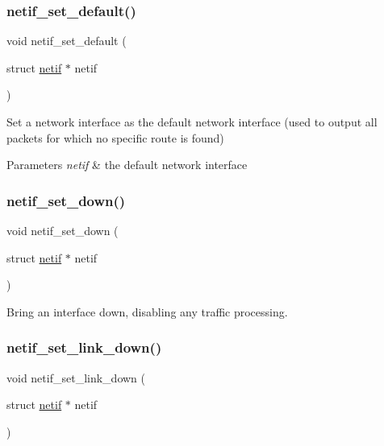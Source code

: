 \subsubsection{\texorpdfstring{netif\+\_\+set\+\_\+default()}{netif\_set\_default()}}
{\footnotesize\ttfamily void netif\+\_\+set\+\_\+default (\begin{DoxyParamCaption}\item[{struct \hyperlink{structnetif}{netif} $\ast$}]{netif }\end{DoxyParamCaption})}

Set a network interface as the default network interface (used to output all packets for which no specific route is found)


\begin{DoxyParams}{Parameters}
{\em netif} & the default network interface \\
\hline
\end{DoxyParams}
\mbox{\label{group__netif_ga641d07ed8c31fe5306bc01605a6790cf}} 
\subsubsection{\texorpdfstring{netif\+\_\+set\+\_\+down()}{netif\_set\_down()}}
{\footnotesize\ttfamily void netif\+\_\+set\+\_\+down (\begin{DoxyParamCaption}\item[{struct \hyperlink{structnetif}{netif} $\ast$}]{netif }\end{DoxyParamCaption})}

Bring an interface down, disabling any traffic processing. \mbox{\label{group__netif_ga34e37a1e8e358760dc1c43887922c7db}} 
\subsubsection{\texorpdfstring{netif\+\_\+set\+\_\+link\+\_\+down()}{netif\_set\_link\_down()}}
{\footnotesize\ttfamily void netif\+\_\+set\+\_\+link\+\_\+down (\begin{DoxyParamCaption}\item[{struct \hyperlink{structnetif}{netif} $\ast$}]{netif }\end{DoxyParamCaption})}

